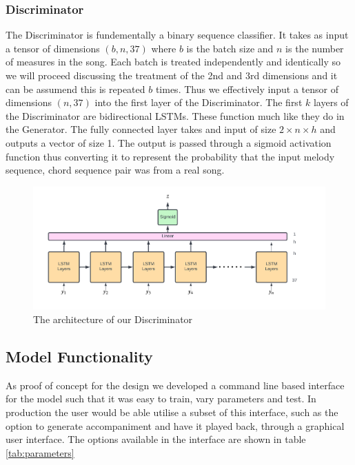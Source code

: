 \subsubsection{Discriminator}
The Discriminator is fundementally a binary sequence classifier.
It takes as input a tensor of dimensions $(b,n,37)$ where $b$ is the batch size and $n$ is the number of measures in the song.
Each batch is treated independently and identically so we will proceed discussing the treatment of the 2nd and 3rd dimensions and it can be assumend this is repeated $b$ times.
Thus we effectively input a tensor of dimensions $(n,37)$ into the first layer of the Discriminator.
The first $k$ layers of the Discriminator are bidirectional LSTMs. 
These function much like they do in the Generator.
The fully connected layer takes and input of size $2 \times n \times h$ and outputs a vector of size 1.
The output is passed through a sigmoid activation function thus converting it to represent the probability that the input melody sequence, chord sequence pair was from a real song.

\begin{figure}
    \centering
    \includegraphics[width=0.8\columnwidth]{Figures/Discriminator}
    \decoRule
    \caption{The architecture of our Discriminator}
    \label{fig:Discriminator}
\end{figure}


\subsection{Model Functionality}

As proof of concept for the design we developed a command line based interface for the model such that it was easy to train, vary parameters and test. 
In production the user would be able utilise a subset of this interface, such as the option to generate accompaniment and have it played back, through a graphical user interface.
The options available in the interface are shown in table \ref{tab:parameters}

